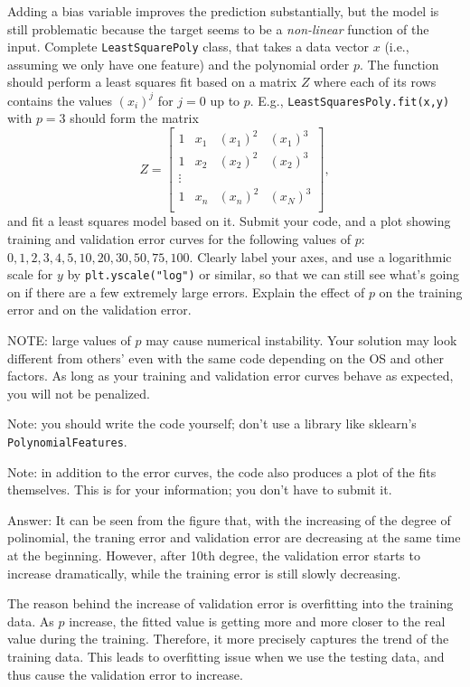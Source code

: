 \documentclass{article}
\newcommand{\blu}[1]{{\textcolor{blu}{#1}}}
\newenvironment{answer}{\par\begingroup\color{gre}Answer: }{\endgroup}
\let\ask\blu
\begin{document}
Adding a bias variable improves the prediction substantially, but the model is still problematic because the target seems to be a \emph{non-linear} function of the input.
Complete \texttt{LeastSquarePoly} class, that takes a data vector $x$ (i.e., assuming we only have one feature) and the polynomial order $p$. The function should perform a least squares fit based on a matrix $Z$ where each of its rows contains the values $(x_{i})^j$ for $j=0$ up to $p$. E.g., \texttt{LeastSquaresPoly.fit(x,y)}  with $p = 3$ should form the matrix
\[
Z =
\left[\begin{array}{cccc}
1 & x_1 & (x_1)^2 & (x_1)^3\\
1 & x_2 & (x_2)^2 & (x_2)^3\\
\vdots\\
1 & x_n & (x_n)^2 & (x_N)^3\\
\end{array}
\right],
\]
and fit a least squares model based on it.
\ask{Submit your code, and a plot showing training and validation error curves for the following values of $p$: $0,1,2,3,4,5,10,20,30,50,75,100$. Clearly label your axes, and use a logarithmic scale for $y$} by \texttt{plt.yscale("log")} or similar, so that we can still see what's going on if there are a few extremely large errors. \ask{Explain the effect of $p$ on the training error and on the validation error.}

NOTE: large values of $p$ may cause numerical instability. Your solution may look different from others' even with the same code depending on the OS and other factors. As long as your training and validation error curves behave as expected, you will not be penalized.

Note: you should write the code yourself; don't use a library like sklearn's \texttt{PolynomialFeatures}.

Note: in addition to the error curves, the code also produces a plot of the fits themselves. This is for your information; you don't have to submit it.
\begin{answer}
	It can be seen from the figure that, with the increasing of the degree of polinomial, the traning error and validation error are decreasing at the same time at the beginning. However, after 10th degree, the validation error starts to increase dramatically, while the training error is still slowly decreasing. 

	The reason behind the increase of validation error is overfitting into the training data. As $p$ increase, the fitted value is getting more and more closer to the real value during the training. Therefore, it more precisely captures the trend of the training data. This leads to overfitting issue when we use the testing data, and thus cause the validation error to increase.
\end{answer}
\end{document}
